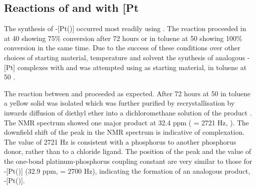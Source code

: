 
\subsection{Reactions of \tBusixantphos{} and \tBuxantphos{} with \texorpdfstring{[Pt\ce{(C6H10)Cl2}{]}} P}

The synthesis of \trans-[Pt(\tButhixantphos)] occurred most readily using \ce{[Pt(C6H10)Cl2]}.  The reaction proceeded in  at 40 \degC{} showing 75\% conversion after 72 hours or in toluene at 50\degC{} showing 100\% conversion in the same time.  Due to the success of these conditions over other choices of starting material, temperature and solvent the synthesis of analogous \trans-[Pt] complexes with \tBusixantphos{} and \tBuxantphos{} was attempted using \ce{[Pt(C6H10)Cl2]} as starting material, in toluene at 50 \degC{}.  

The reaction between \tBuxantphos{} and \ce{[Pt(C6H10)Cl2]} proceeded as expected.  After 72 hours at 50\degC{} in toluene a yellow solid was isolated which was further purified by recrystallisation by inwards diffusion of diethyl ether into a dichloromethane solution of the product .  The \phosphorus{} NMR spectrum showed one major product at 32.4 ppm (\JPtP{} = 2721 Hz, ).  The downfield shift of the peak in the \phosphorus{} NMR spectrum is indicative of complexation.   The value of 2721 Hz is consistent with a phosphorus \trans{} to another phosphorus donor, rather than \trans{} to a chloride ligand.\cite{Rigamonti2010, Appleton1978, Pregosin1980}  The position of the peak and the value of the one-bond platinum-phosphorus coupling constant are very similar to those for \trans-[Pt(\tButhixantphos)] (32.9 ppm, \JPtP{} = 2700 Hz), indicating the formation of an analogous product, \trans-[Pt(\tBuxantphos)].

